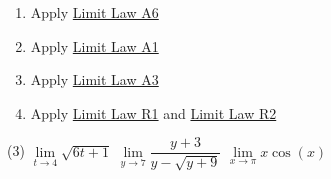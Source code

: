 \documentclass[12pt,]{book}
\theoremstyle{plain}
\theoremstyle{definition}
\theoremstyle{definition}
\theoremstyle{definition}
\theoremstyle{definition}
\theoremstyle{definition}
\numberwithin{equation}{section}
\begin{document}
\leavevmode%
\begin{enumerate}[label=(\alph*)]
\item\hypertarget{li-17}{}Apply \hyperref[lla6]{Limit Law A6}%
\item\hypertarget{li-18}{}Apply \hyperref[lla1]{Limit Law A1}%
\item\hypertarget{li-19}{}Apply \hyperref[lla3]{Limit Law A3}%
\item\hypertarget{li-20}{}Apply \hyperref[llr1]{Limit Law R1} and \hyperref[llr2]{Limit Law R2}%
\end{enumerate}
\begin{exercisegroup}(3)
\exercise[4.]\hypertarget{exercise-first-apply-limit-laws}{}\(\lim\limits_{t\to4}\sqrt{6t+1}\)%
\exercise[5.]\hypertarget{exercise-70}{}\(\lim\limits_{y\to7}\dfrac{y+3}{y-\sqrt{y+9}}\)%
\exercise[6.]\hypertarget{exercise-71}{}\(\lim\limits_{x\to\pi}x\cos(x)\)%
\end{exercisegroup}
\par\smallskip\noindent
\typeout{************************************************}
\typeout{************************************************}
\end{document}
